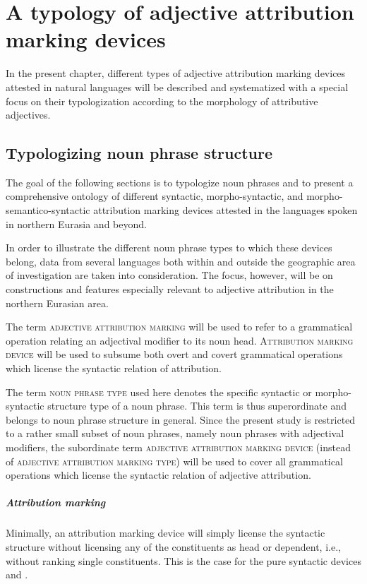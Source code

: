 
\chapter[Typology of attribution marking]{A typology of adjective attribution marking devices}
\label{ontology}
In the present chapter, different types of adjective attribution marking devices attested in natural languages will be described and systematized with a special focus on their typologization according to the morphology of attributive adjectives.

\section{Typologizing noun phrase structure}
The goal of the following sections is to typologize noun phrases and to present a comprehensive ontology of different syntactic, morpho-syntactic, and morpho-semantico-syntactic attribution marking devices attested in the languages spoken in northern Eurasia and beyond. 

In order to illustrate the different noun phrase types to which these devices belong, data from several languages both within and outside the geographic area of investigation are taken into consideration. The focus, however, will be on constructions and features especially relevant to adjective attribution in the northern Eurasian area.

The term \textsc{adjective attribution marking} will be used to refer to a grammatical operation relating an adjectival modifier to its noun head. \textsc{Attribution marking device} will be used to subsume both overt and covert grammatical operations which license the syntactic relation of attribution. 

The term \textsc{noun phrase type} used here denotes the specific syntactic or morpho-syntactic structure type of a noun phrase. This term is thus superordinate and belongs to noun phrase structure in general. Since the present study is restricted to a rather small subset of noun phrases, namely noun phrases with adjectival modifiers, the subordinate term \textsc{adjective attribution marking device} (instead of \textsc{adjective attribution marking type}) will be used to cover all grammatical operations which license the syntactic relation of adjective attribution.

\paragraph*{Attribution marking} Minimally, an attribution marking device will simply license the syntactic structure without licensing any of the constituents as head or dependent, i.e., without ranking single constituents. This is the case for the pure syntactic devices \textsc{} and \textsc{}.

